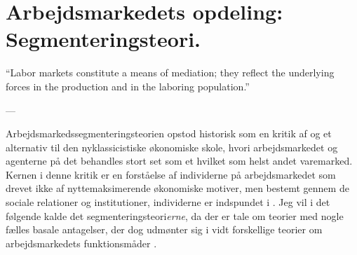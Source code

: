 
\chapter{Arbejdsmarkedets opdeling: Segmenteringsteori. \label{segteoriteori}}

\vspace{20pt} \epigraphfontsize{\small\itshape}
\epigraphfontsize{\small\itshape}
\epigraph{“Labor markets constitute a means of mediation; they reflect the underlying forces in the production and in the laboring population.”}{--- \textup{\parencite[177]{Edwards1979}}}


Arbejdsmarkedssegmenteringsteorien opstod historisk som en kritik af og et alternativ til den nyklassicistiske økonomiske skole, hvori arbejdsmarkedet og agenterne på det behandles stort set som et hvilket som helst andet varemarked. Kernen i denne kritik er en forståelse af individerne på arbejdsmarkedet som drevet ikke af nyttemaksimerende økonomiske motiver, men bestemt gennem de sociale relationer og institutioner, individerne er indspundet i \parencite[173]{Boje1986}. Jeg vil i det følgende kalde det segmenteringsteori\emph{erne}, da der er tale om teorier med nogle fælles basale antagelser, der dog udmønter sig i vidt forskellige teorier om arbejdsmarkedets funktionsmåder \parencite[177]{Edwards1979}. 


